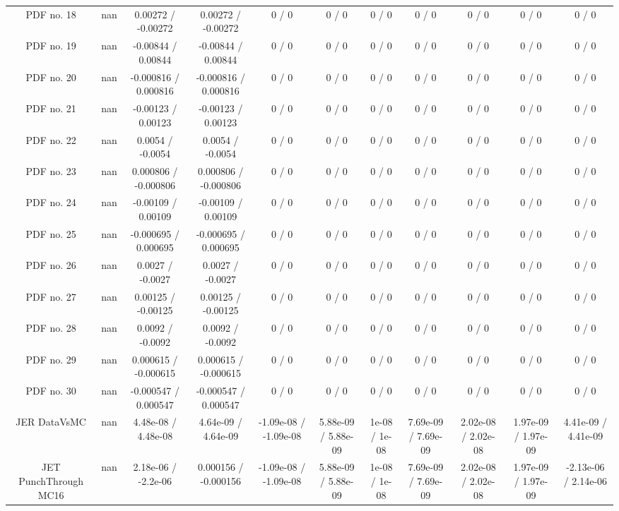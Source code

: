 \begin{table}[htbp]
\begin{center}
\begin{tabular}{|c|c|c|c|c|c|c|c|c|c|c|}
  PDF no. 18 &    nan    & 0.00272 / -0.00272 & 0.00272 / -0.00272 & 0 / 0 & 0 / 0 & 0 / 0 & 0 / 0 & 0 / 0 & 0 / 0 & 0 / 0 \\ 
  PDF no. 19 &    nan    & -0.00844 / 0.00844 & -0.00844 / 0.00844 & 0 / 0 & 0 / 0 & 0 / 0 & 0 / 0 & 0 / 0 & 0 / 0 & 0 / 0 \\ 
  PDF no. 20 &    nan    & -0.000816 / 0.000816 & -0.000816 / 0.000816 & 0 / 0 & 0 / 0 & 0 / 0 & 0 / 0 & 0 / 0 & 0 / 0 & 0 / 0 \\ 
  PDF no. 21 &    nan    & -0.00123 / 0.00123 & -0.00123 / 0.00123 & 0 / 0 & 0 / 0 & 0 / 0 & 0 / 0 & 0 / 0 & 0 / 0 & 0 / 0 \\ 
  PDF no. 22 &    nan    & 0.0054 / -0.0054 & 0.0054 / -0.0054 & 0 / 0 & 0 / 0 & 0 / 0 & 0 / 0 & 0 / 0 & 0 / 0 & 0 / 0 \\ 
  PDF no. 23 &    nan    & 0.000806 / -0.000806 & 0.000806 / -0.000806 & 0 / 0 & 0 / 0 & 0 / 0 & 0 / 0 & 0 / 0 & 0 / 0 & 0 / 0 \\ 
  PDF no. 24 &    nan    & -0.00109 / 0.00109 & -0.00109 / 0.00109 & 0 / 0 & 0 / 0 & 0 / 0 & 0 / 0 & 0 / 0 & 0 / 0 & 0 / 0 \\ 
  PDF no. 25 &    nan    & -0.000695 / 0.000695 & -0.000695 / 0.000695 & 0 / 0 & 0 / 0 & 0 / 0 & 0 / 0 & 0 / 0 & 0 / 0 & 0 / 0 \\ 
  PDF no. 26 &    nan    & 0.0027 / -0.0027 & 0.0027 / -0.0027 & 0 / 0 & 0 / 0 & 0 / 0 & 0 / 0 & 0 / 0 & 0 / 0 & 0 / 0 \\ 
  PDF no. 27 &    nan    & 0.00125 / -0.00125 & 0.00125 / -0.00125 & 0 / 0 & 0 / 0 & 0 / 0 & 0 / 0 & 0 / 0 & 0 / 0 & 0 / 0 \\ 
  PDF no. 28 &    nan    & 0.0092 / -0.0092 & 0.0092 / -0.0092 & 0 / 0 & 0 / 0 & 0 / 0 & 0 / 0 & 0 / 0 & 0 / 0 & 0 / 0 \\ 
  PDF no. 29 &    nan    & 0.000615 / -0.000615 & 0.000615 / -0.000615 & 0 / 0 & 0 / 0 & 0 / 0 & 0 / 0 & 0 / 0 & 0 / 0 & 0 / 0 \\ 
  PDF no. 30 &    nan    & -0.000547 / 0.000547 & -0.000547 / 0.000547 & 0 / 0 & 0 / 0 & 0 / 0 & 0 / 0 & 0 / 0 & 0 / 0 & 0 / 0 \\ 
  JER DataVsMC &    nan    & 4.48e-08 / 4.48e-08 & 4.64e-09 / 4.64e-09 & -1.09e-08 / -1.09e-08 & 5.88e-09 / 5.88e-09 & 1e-08 / 1e-08 & 7.69e-09 / 7.69e-09 & 2.02e-08 / 2.02e-08 & 1.97e-09 / 1.97e-09 & 4.41e-09 / 4.41e-09 \\ 
  JET PunchThrough MC16 &    nan    & 2.18e-06 / -2.2e-06 & 0.000156 / -0.000156 & -1.09e-08 / -1.09e-08 & 5.88e-09 / 5.88e-09 & 1e-08 / 1e-08 & 7.69e-09 / 7.69e-09 & 2.02e-08 / 2.02e-08 & 1.97e-09 / 1.97e-09 & -2.13e-06 / 2.14e-06 \\ 

\end{tabular}
\end{center}
\end{table}
